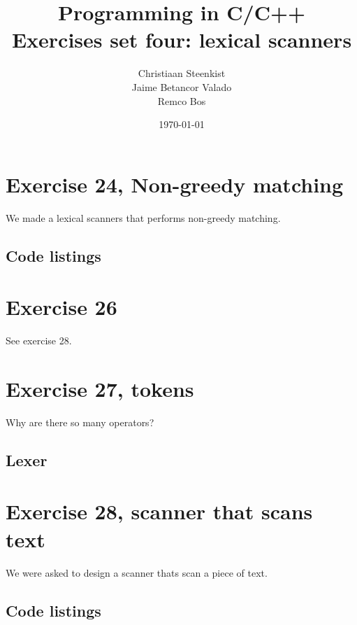 \documentclass[11pt]{article}
\begin{document}
\title{Programming in C/C++ \\
       Exercises set four: lexical scanners
}
\date{\today}
\author{Christiaan Steenkist \\
Jaime Betancor Valado \\
Remco Bos \\
}

\maketitle
\section*{Exercise 24, Non-greedy matching}
We made a lexical scanners that performs non-greedy matching.

\subsection*{Code listings}





\section*{Exercise 26}
See exercise 28.

\section*{Exercise 27, tokens}
Why are there so many operators?

\subsection*{Lexer}


\section*{Exercise 28, scanner that scans text}
We were asked to design a scanner thats scan a piece of text.

\subsection*{Code listings}






\end{document}
